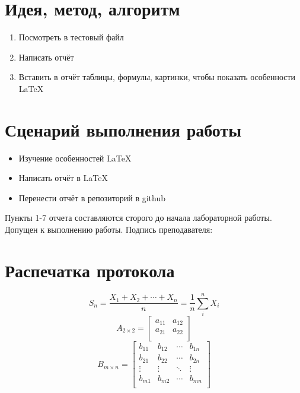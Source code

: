 \documentclass{article}
\begin{document}
\section{Идея, метод, алгоритм }   
\begin{enumerate}
\item Посмотреть в тестовый файл
\item Написать отчёт
\item Вставить в отчёт таблицы, формулы, картинки, чтобы показать особенности LaTeX
\end{enumerate}

\section{Сценарий выполнения работы} 
\begin{itemize}
\item Изучение особенностей \LaTeX
\item Написать отчёт в \LaTeX
\item Перенести отчёт в репозиторий в github
\end{itemize} 

Пункты 1-7 отчета составляются сторого до начала лабораторной работы. Допущен к выполнению работы.
Подпись преподавателя: 

\section{Распечатка протокола}

\[S_n = \frac{X_1 + X_2 + \cdots + X_n}{n}
      = \frac{1}{n}\sum_{i}^{n} X_i\]
\vspace{0.5cm}
\[
  A_{2\times2} =
  \left[ {\begin{array}{cc}
    a_{11} & a_{12} \\
    a_{21} & a_{22} \\
  \end{array} } \right]
\]
\vspace{0.5cm}
\[
  B_{m\times n} =
  \left[ {\begin{array}{cccc}
    b_{11} & b_{12} & \cdots & b_{1n}\\
    b_{21} & b_{22} & \cdots & b_{2n}\\
    \vdots & \vdots & \ddots & \vdots\\
    b_{m1} & b_{m2} & \cdots & b_{mn}\\
  \end{array} } \right]
\]

\vspace{2cm}
\end{document}
